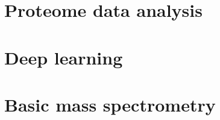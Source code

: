 \documentclass[
]{book}
\begin{document}
\hypertarget{proteome-data-analysis}{%
\section{Proteome data analysis}\label{proteome-data-analysis}}

\hypertarget{deep-learning}{%
\section{Deep learning}\label{deep-learning}}

\hypertarget{basic-mass-spectrometry}{%
\section{Basic mass spectrometry}\label{basic-mass-spectrometry}}

  
\end{document}
